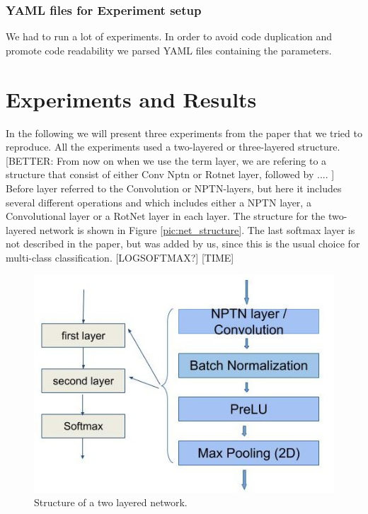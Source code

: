 \documentclass{llncs}
\begin{document}
\subsubsection{YAML files for Experiment setup}
We had to run a lot of experiments. In order to avoid code duplication and promote code readability we parsed YAML files containing the parameters.

\section{Experiments and Results}	
In the following we will present three experiments from the paper that we tried to reproduce. 
All the experiments used a two-layered or three-layered structure. [BETTER: From now on when we use the term layer, we are refering to a structure that consist of either Conv Nptn or Rotnet layer, followed by .... ] Before layer referred to the Convolution or NPTN-layers, but here it includes several different operations and  which includes either a NPTN layer, a Convolutional layer or a RotNet layer in each layer. The structure for the two-layered network is shown in Figure \ref{pic:net_structure}. The last softmax layer is not described in the paper, but was added by us, since this is the usual choice for multi-class classification. [LOGSOFTMAX?]
[TIME]
\begin{figure}
	\begin{center}
	\includegraphics[scale=0.35]{result_images/network_structure.jpg}
	\caption{Structure of a two layered network.}
	\label{pic:network_structure}
	\end{center}
\end{figure}
\end{document}
